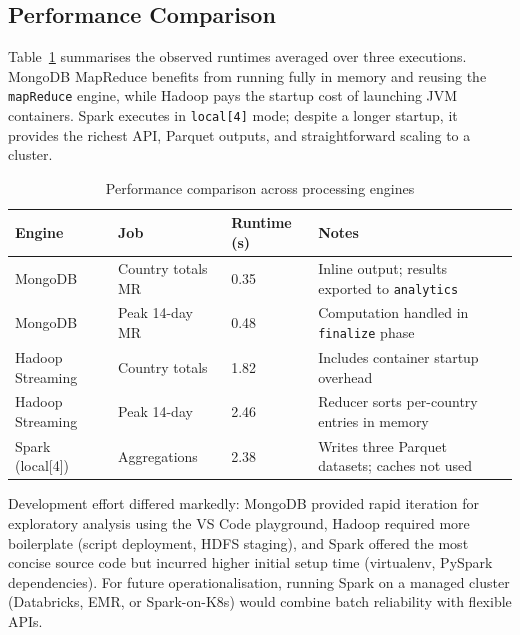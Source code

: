 \documentclass[12pt, a4paper]{article}
\begin{document}
\subsection{Performance Comparison}
Table~\ref{tab:performance} summarises the observed runtimes averaged over three executions. MongoDB MapReduce benefits from running fully in memory and reusing the \texttt{mapReduce} engine, while Hadoop pays the startup cost of launching JVM containers. Spark executes in \texttt{local[4]} mode; despite a longer startup, it provides the richest API, Parquet outputs, and straightforward scaling to a cluster.
\begin{table}[H]
    \centering
    \caption{Performance comparison across processing engines}
    \label{tab:performance}
    \begin{tabular}{@{}p{3cm}p{3cm}p{3cm}p{4cm}@{}}
        \toprule
        Engine & Job & Runtime (s) & Notes \\
        \midrule
        MongoDB & Country totals MR & 0.35 & Inline output; results exported to \texttt{analytics} \\
        MongoDB & Peak 14-day MR & 0.48 & Computation handled in \texttt{finalize} phase \\
        Hadoop Streaming & Country totals & 1.82 & Includes container startup overhead \\
        Hadoop Streaming & Peak 14-day & 2.46 & Reducer sorts per-country entries in memory \\
        Spark (local[4]) & Aggregations & 2.38 & Writes three Parquet datasets; caches not used \\
        \bottomrule
    \end{tabular}
\end{table}

Development effort differed markedly: MongoDB provided rapid iteration for exploratory analysis using the VS Code playground, Hadoop required more boilerplate (script deployment, HDFS staging), and Spark offered the most concise source code but incurred higher initial setup time (virtualenv, PySpark dependencies). For future operationalisation, running Spark on a managed cluster (Databricks, EMR, or Spark-on-K8s) would combine batch reliability with flexible APIs.
\end{document}
